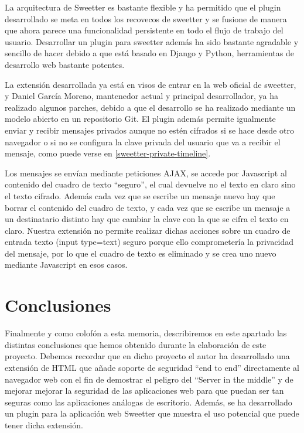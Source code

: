 La arquitectura de Sweetter es bastante flexible y ha permitido que el plugin desarrollado  se meta en todos los recovecos de sweetter y se fusione de manera que ahora parece una funcionalidad persistente en todo el flujo de trabajo del usuario. Desarrollar un plugin para sweetter además ha sido bastante agradable y sencillo de hacer debido a que está basado en Django y Python, herramientas de desarrollo web bastante potentes.

La extensión desarrollada ya está en visos de entrar en la web oficial de sweetter, y Daniel García Moreno, mantenedor actual y principal desarrollador, ya ha realizado algunos parches, debido a que el desarrollo se ha realizado mediante un modelo abierto en un repositorio Git. El plugin además permite igualmente enviar y recibir mensajes privados aunque no estén cifrados si se hace desde otro navegador o si no se configura la clave privada del usuario que va a recibir el mensaje, como puede verse en \ref{sweetter-private-timeline}.  

Los mensajes se envían mediante peticiones AJAX, se accede por Javascript al contenido del cuadro de texto ``seguro'',  el cual devuelve no el texto en claro sino el texto cifrado. Además cada vez que se escribe un mensaje nuevo hay que borrar el contenido del cuadro de texto, y cada vez que se escribe un mensaje a un destinatario distinto hay que cambiar la clave con la que se cifra el texto en claro. Nuestra extensión no permite realizar dichas acciones sobre un cuadro de entrada texto (input type=text) seguro porque ello comprometería la privacidad del mensaje, por lo que el cuadro de texto es eliminado y se crea uno nuevo mediante Javascript en esos casos.

\section{Conclusiones}\label{conclusiones} 

Finalmente y como colofón a esta memoria, describiremos en este apartado las distintas conclusiones que hemos obtenido durante la elaboración de este proyecto. Debemos recordar que en dicho proyecto el autor ha desarrollado una extensión de HTML que añade soporte de seguridad ``end to end'' directamente al navegador web con el fin de demostrar el peligro del ``Server in the middle'' y de mejorar mejorar la seguridad de las aplicaciones web para que puedan ser tan seguras como las aplicaciones análogas de escritorio. Además, se ha desarrollado un plugin para la aplicación web Sweetter que muestra el uso potencial que puede tener dicha extensión.

